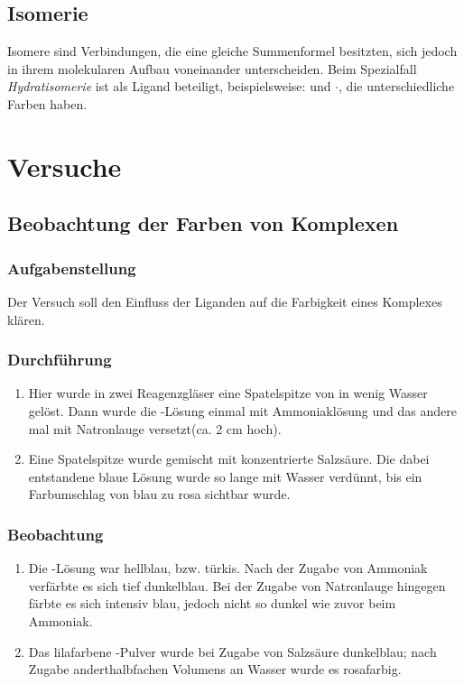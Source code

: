 \documentclass{scrartcl}
\begin{document}
\subsection{Isomerie}
Isomere sind Verbindungen, die eine gleiche Summenformel besitzten, sich jedoch in ihrem molekularen Aufbau voneinander unterscheiden. Beim Spezialfall \emph{Hydratisomerie} ist  als Ligand beteiligt, beispielsweise:  und $\cdot$, die unterschiedliche Farben haben.
\section{Versuche}
\subsection{Beobachtung der Farben von Komplexen}
\subsubsection{Aufgabenstellung}
Der Versuch soll den Einfluss der Liganden auf die Farbigkeit eines Komplexes klären.
\subsubsection{Durchführung}
\begin{enumerate}[label=\alph*)]
	\item Hier wurde in zwei Reagenzgläser eine Spatelspitze von  in wenig Wasser gelöst. Dann wurde die -Lösung einmal mit Ammoniaklösung und das andere mal mit Natronlauge versetzt(ca. 2 cm hoch).
	\item Eine Spatelspitze  wurde gemischt mit konzentrierte Salzsäure. Die dabei entstandene blaue Lösung wurde so lange mit Wasser verdünnt, bis ein Farbumschlag von blau zu rosa sichtbar wurde.
\end{enumerate}
\subsubsection{Beobachtung}
\begin{enumerate}[label=\alph*)]
	\item Die -Lösung war hellblau, bzw. türkis. Nach der Zugabe von Ammoniak verfärbte es sich tief dunkelblau.
Bei der Zugabe von Natronlauge hingegen färbte es sich intensiv blau, jedoch nicht so dunkel wie zuvor beim Ammoniak.

\item Das lilafarbene -Pulver wurde bei Zugabe von Salzsäure dunkelblau; nach Zugabe anderthalbfachen Volumens an Wasser wurde es rosafarbig.
	\end{enumerate}
\end{document}

